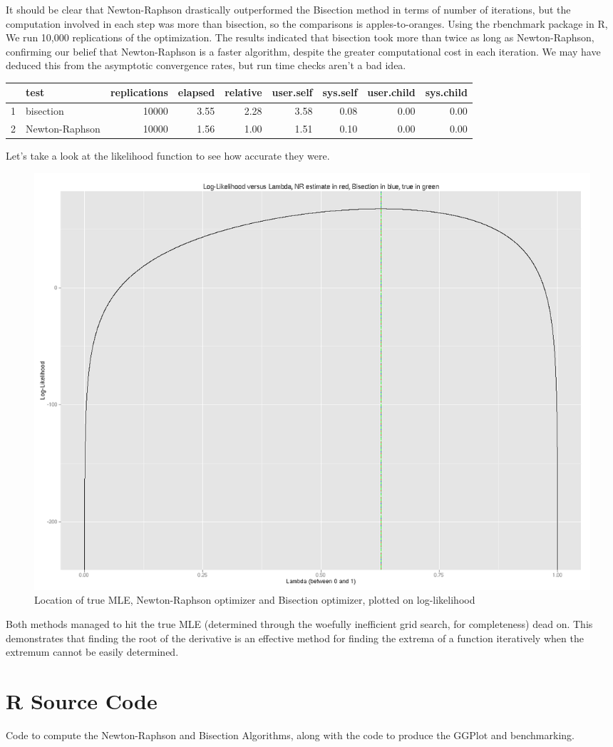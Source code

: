 \documentclass[12pt]{article}
\begin{document}
It should be clear that Newton-Raphson drastically outperformed the Bisection method in terms of number of iterations, but the computation involved in each step was more than bisection, so the comparisons is apples-to-oranges. Using the rbenchmark package in R, We run 10,000 replications of the optimization. The results indicated that bisection took more than twice as long as Newton-Raphson, confirming our belief that Newton-Raphson is a faster algorithm, despite the greater computational cost in each iteration. We may have deduced this from the asymptotic convergence rates, but run time checks aren't a bad idea.
\begin{table}[H] \center \small
\begin{tabular}{rlrrrrrrr} \hline
 & test & replications & elapsed & relative & user.self & sys.self & user.child & sys.child \\ 
  \hline
1 & bisection & 10000 & 3.55 & 2.28 & 3.58 & 0.08 & 0.00 & 0.00 \\ 
2 & Newton-Raphson & 10000 & 1.56 & 1.00 & 1.51 & 0.10 & 0.00 & 0.00 \\ \hline
\end{tabular}
\end{table}

Let's take a look at the likelihood function to see how accurate they were.
\begin{figure}[H] \center
\includegraphics[scale=.40]{Optimizations/LogLike.png}
\caption*{Location of true MLE, Newton-Raphson optimizer and Bisection optimizer, plotted on log-likelihood}
\end{figure}

Both methods managed to hit the true MLE (determined through the woefully inefficient grid search, for completeness) dead on. This demonstrates that finding the root of the derivative is an effective method for finding the extrema of a function iteratively when the extremum cannot be easily determined.

\newpage
\section*{R Source Code}
Code to compute the Newton-Raphson and Bisection Algorithms, along with the code to produce the GGPlot and benchmarking.

\end{document}
